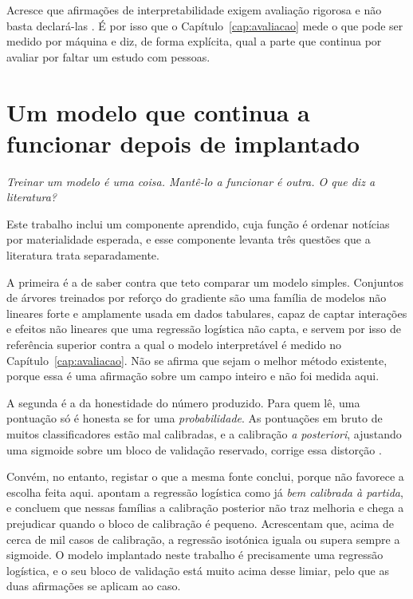 Acresce que afirmações de interpretabilidade exigem avaliação rigorosa e não basta declará-las
\autocite{doshivelez2017rigorous}. É por isso que o Capítulo~\ref{cap:avaliacao} mede o que pode ser
medido por máquina e diz, de forma explícita, qual a parte que continua por avaliar por faltar um
estudo com pessoas.

\section{Um modelo que continua a funcionar depois de implantado}
\label{sec:ctx_producao}

\emph{Treinar um modelo é uma coisa. Mantê-lo a funcionar é outra. O que diz a literatura?}

Este trabalho inclui um componente aprendido, cuja função é ordenar notícias por materialidade
esperada, e esse componente levanta três questões que a literatura trata separadamente.

A primeira é a de saber contra que teto comparar um modelo simples. Conjuntos de árvores treinados
por reforço do gradiente \autocite{friedman2001gbm} são uma família de modelos não lineares forte e amplamente
usada em dados tabulares, capaz de captar interações e efeitos não lineares que uma regressão
logística não capta, e servem por isso de referência superior contra a qual o modelo interpretável é
medido no Capítulo~\ref{cap:avaliacao}. Não se afirma que sejam o melhor método existente, porque
essa é uma afirmação sobre um campo inteiro e não foi medida aqui.

A segunda é a da honestidade do número produzido. Para quem lê, uma pontuação só é honesta se for uma
\emph{probabilidade}. As pontuações em bruto de muitos classificadores estão mal calibradas, e a
calibração \emph{a posteriori}, ajustando uma sigmoide sobre um bloco de validação reservado, corrige
essa distorção \autocite{niculescu2005calibration}.

Convém, no entanto, registar o que a mesma fonte conclui, porque não favorece a escolha feita aqui.
\textcite{niculescu2005calibration} apontam a regressão logística como já \emph{bem calibrada à
partida}, e concluem que nessas famílias a calibração posterior não traz melhoria e chega a
prejudicar quando o bloco de calibração é pequeno. Acrescentam que, acima de cerca de mil casos de
calibração, a regressão isotónica iguala ou supera sempre a sigmoide. O modelo implantado neste
trabalho é precisamente uma regressão logística, e o seu bloco de validação está muito acima desse
limiar, pelo que as duas afirmações se aplicam ao caso.

